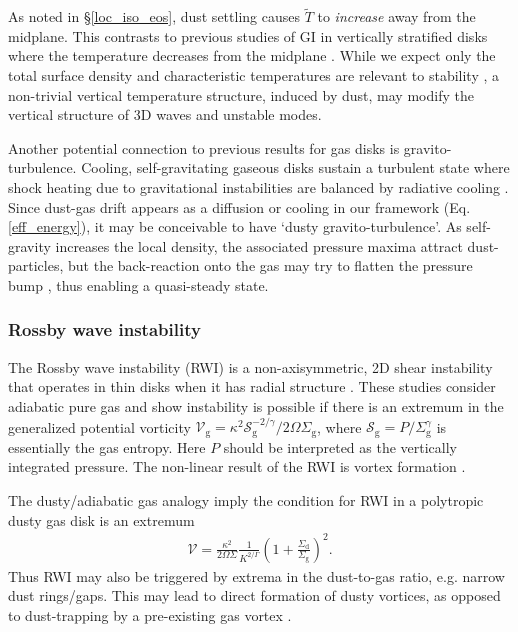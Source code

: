 As noted in \S\ref{loc_iso_eos}, dust settling causes 
$\widetilde{T}$ to \emph{increase} away from the midplane. This contrasts
to previous studies of GI in vertically stratified disks
 where the temperature decreases
from the midplane \citep[e.g.][]{mamat10, kim12,lin14c}. 
While we expect only the total surface density and
characteristic temperatures are relevant to stability  
\citep{toomre64}, a non-trivial vertical temperature
structure, induced by dust, may modify the vertical structure of 3D
waves and unstable modes. 

Another potential connection to previous results for gas disks is  
gravito-turbulence. Cooling, self-gravitating gaseous disks 
sustain a turbulent state where shock heating due to gravitational 
instabilities are balanced by radiative cooling 
\citep{gammie01}. Since dust-gas drift appears as a diffusion or 
cooling in our framework (Eq. \ref{eff_energy}), it may be conceivable
to have `dusty gravito-turbulence'. As self-gravity increases the
local density, the associated pressure maxima attract dust-particles,
but the back-reaction onto the gas may try to flatten the pressure
bump \citep{taki16}, thus enabling a quasi-steady state. 


\subsubsection{Rossby wave instability}
The Rossby wave instability (RWI) is a non-axisymmetric, 2D shear
instability that operates in thin disks when it has radial structure
\citep{lovelace99,li00}. These studies consider adiabatic pure gas and 
show instability is possible if there is an extremum in the generalized
potential vorticity 
 $\mathcal{V}_\mathrm{g} =
 \kappa^2\mathcal{S}_\mathrm{g}^{-2/\gamma}/2\Omega\Sigma_\mathrm{g}$, 
where $\mathcal{S}_\mathrm{g} = P/\Sigma_\mathrm{g}^\gamma$ is essentially
the gas entropy. Here $P$
should be interpreted as the vertically integrated pressure. The
non-linear result of the RWI is vortex formation \citep{li01}. 

The dusty/adiabatic gas analogy imply the condition for RWI in a
polytropic dusty gas disk is an extremum   
\begin{align}
  \mathcal{V} =
  \frac{\kappa^2}{2\Omega\Sigma}\frac{1}{K^{2/\Gamma}}\left(1+
    \frac{\Sigma_\mathrm{d}}{\Sigma_\mathrm{g}}\right)^2.    
\end{align}
Thus RWI may also be triggered by extrema 
in the dust-to-gas ratio, e.g. narrow dust rings/gaps. This may lead 
to direct formation of dusty vortices, as opposed to dust-trapping by  
a pre-existing gas vortex \citep{barge95,lyra13}.  

